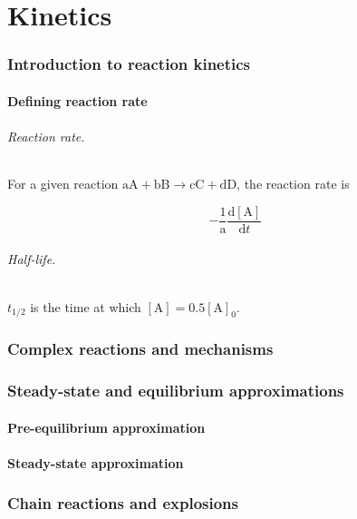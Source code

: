 \documentclass{article}
\numberwithin{theorem}{section}
\numberwithin{corollary}{section}
\numberwithin{postulate}{section}
\numberwithin{lemma}{section}
\numberwithin{definition}{section}
\begin{document}
\part{Kinetics}

\section{Introduction to reaction kinetics}

\subsection{Defining reaction rate}

\paragraph{Reaction rate.} For a given reaction $\mathrm{aA} + \mathrm{bB}
\rightarrow \mathrm{cC} + \mathrm{dD}$, the reaction rate is

\begin{equation}
  -\frac{1}{\mathrm{a}} \frac{\mathrm{d[A]}}{\mathrm{d}t} 
\end{equation}

\paragraph{Half-life.} $t_{1/2}$ is the time at which $[\mathrm{A}] =
0.5[\mathrm{A}]_0$.


\section{Complex reactions and mechanisms}

\section{Steady-state and equilibrium approximations}

\subsection{Pre-equilibrium approximation}

\subsection{Steady-state approximation}

\section{Chain reactions and explosions}
\end{document}
